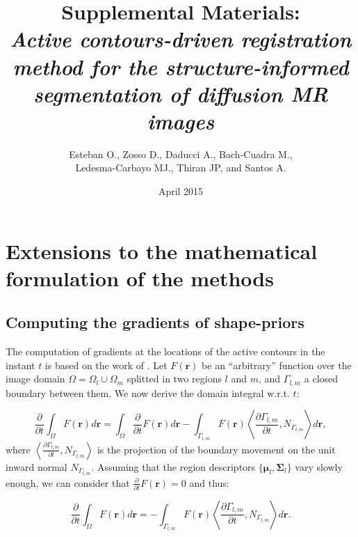 \documentclass[a4paper]{report}
\renewcommand{\vec}[1]{\mathbf{#1}}
\begin{document}
\title{Supplemental Materials: \\ \emph{Active contours-driven registration method for the structure-informed segmentation of diffusion MR images}}
\author{Esteban O., Zosso D., Daducci A., Bach-Cuadra M., \\ Ledesma-Carbayo MJ., Thiran JP, and Santos A.}
\date{April 2015}

\maketitle
\section{Extensions to the mathematical formulation of the methods}\label{sec:maths_extension}

\subsection{Computing the gradients of shape-priors}\label{sec:shape_priors}
The computation of gradients at the locations of the active contours in the
  instant $t$ is based on the work of \cite{herbulot_segmentation_2006}.
Let $F(\vec{r})$ be an ``arbitrary'' function over the image domain
  $\Omega = \Omega_l \cup \Omega_m$ splitted in two regions $l$ and
  $m$, and $\Gamma_{l,m}$ a closed boundary between them.
We now derive the domain integral w.r.t. $t$:

  \begin{equation}
  \frac{\partial}{\partial t} \int_\Omega F(\vec{r}) d\vec{r} =
  \int_\Omega \frac{\partial}{\partial t}F(\vec{r}) d\vec{r}
  - \int_{\Gamma_{l,m}} F(\vec{r}) \left\langle \frac{\partial \Gamma_{l,m} }{\partial t},
  N_{\Gamma_{l,m}}\right\rangle d\vec{r},
  \end{equation}
%
  where $\left\langle\frac{\partial\Gamma_{l,m}}{\partial t}, N_{\Gamma_{l,m}}\right\rangle$ is
  the projection of the boundary movement on the unit inward normal $N_{\Gamma_{l,m}}$.
Assuming that the region descriptors $\{\boldsymbol{\mu}_l, \boldsymbol{\Sigma}_l\}$ vary slowly enough, we can consider
  that $\frac{\partial}{\partial t} F(\vec{r}) = 0$ and thus:

  \begin{equation}
  \frac{\partial}{\partial t} \int_\Omega F(\vec{r}) d\vec{r} =
  - \int_{\Gamma_{l,m}} F(\vec{r}) \left\langle \frac{\partial \Gamma_{l,m} }{\partial t},
  N_{\Gamma_{l,m}}\right\rangle d\vec{r}.
  \label{eq:shape_gradients}
  \end{equation}
\end{document}
